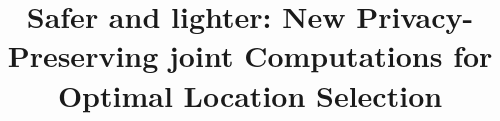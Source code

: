 \documentclass[IEEE JOURNAL OF BIOMEDICAL AND HEALTH INFORMATICS]{IEEEtran}
\begin{document}
%

\title{Safer and lighter: New Privacy-Preserving joint  Computations for Optimal Location Selection}


%
%





%
\end{document}
